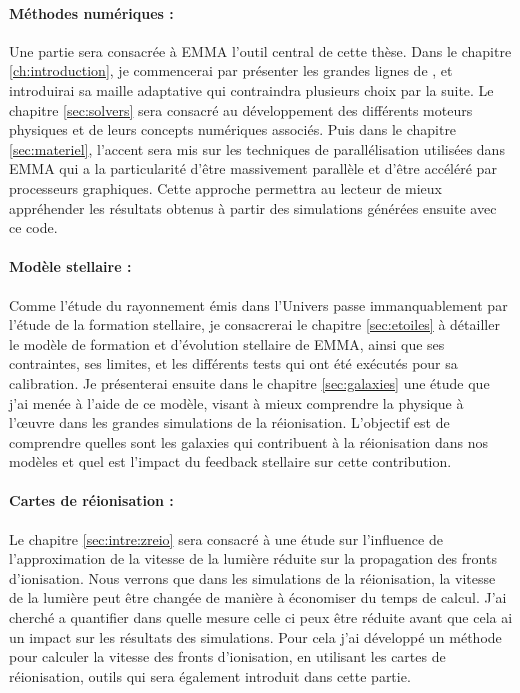 \paragraph{Méthodes numériques :}
Une partie sera consacrée à EMMA l'outil central de cette thèse.
Dans le chapitre \ref{ch:introduction}, je commencerai par présenter les grandes lignes de \emma, et introduirai sa maille adaptative qui contraindra plusieurs choix par la suite.
Le chapitre \ref{sec:solvers} sera consacré au développement des différents moteurs physiques et de leurs concepts numériques associés.
Puis dans le chapitre \ref{sec:materiel}, l'accent sera mis sur les techniques de parallélisation utilisées dans EMMA qui a la particularité d'être massivement parallèle et d'être accéléré par processeurs graphiques.
Cette approche permettra au lecteur de mieux appréhender les résultats obtenus à partir des simulations générées ensuite avec ce code.

\paragraph{Modèle stellaire :}
Comme l'étude du rayonnement émis dans l'Univers passe immanquablement par l'étude de la formation stellaire, je consacrerai le chapitre \ref{sec:etoiles} à détailler le modèle de formation et d'évolution stellaire de EMMA, ainsi que ses contraintes, ses limites, et les différents tests qui ont été exécutés pour sa calibration.
Je présenterai ensuite dans le chapitre \ref{sec:galaxies} une étude que j'ai menée à l'aide de ce modèle, visant à mieux comprendre la physique à l'œuvre dans les grandes simulations de la réionisation.
L'objectif est de comprendre quelles sont les galaxies qui contribuent à la réionisation dans nos modèles et quel est l'impact du feedback stellaire sur cette contribution.

\paragraph{Cartes de réionisation :}
Le chapitre \ref{sec:intre:zreio} sera consacré à une étude sur l'influence de l'approximation de la vitesse de la lumière réduite sur la propagation des fronts d'ionisation.
Nous verrons que dans les simulations de la réionisation, la vitesse de la lumière peut être changée de manière à économiser du temps de calcul.
J'ai cherché a quantifier dans quelle mesure celle ci peux être réduite avant que cela ai un impact sur les résultats des simulations.
Pour cela j'ai développé un méthode pour calculer la vitesse des fronts d'ionisation, en utilisant les cartes de réionisation, outils qui sera également introduit dans cette partie.

